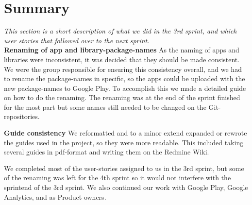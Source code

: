 \section{Summary} 
\textit{This section is a short description of what we did in the 3rd sprint, and which user stories that followed over to the next sprint.}\\

\textbf{Renaming of app and library-package-names}
As the naming of apps and libraries were inconsistent, it was decided that they should be made consistent. We were the group responsible for ensuring this consistency overall, and we had to rename the package-names in specific, so the apps could be uploaded with the new package-names to Google Play. To accomplish this we made a detailed guide on how to do the renaming. The renaming was at the end of the sprint finished for the most part but some names still needed to be changed on the Git-repositories.

\textbf{Guide consistency}
We reformatted and to a minor extend expanded or rewrote the guides used in the project, so they were more readable. This included taking several guides in pdf-format and writing them on the Redmine Wiki.

We completed most of the user-stories assigned to us in the 3rd sprint, but some of the renaming was left for the 4th sprint so it would not interfere with the sprintend of the 3rd sprint. We also continued our work with Google Play, Google Analytics, and as Product owners.